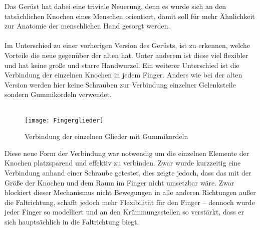 \documentclass[titlepage,12pt,twoside]{article}
\begin{document}
\hfill \break
Das Gerüst hat dabei eine triviale Neuerung, denn es wurde sich an den tatsächlichen Knochen eines Menschen orientiert, damit soll für mehr Ähnlichkeit zur Anatomie der menschlichen Hand gesorgt werden. \\
\\
Im Unterschied zu einer vorherigen Version des Gerüsts, ist zu erkennen, welche Vorteile die neue gegenüber der alten hat. Unter anderem ist diese viel flexibler und hat keine große und starre Handwurzel. 
Ein weiterer Unterschied ist die Verbindung der einzelnen Knochen in jedem Finger. Anders wie bei der alten Version werden hier keine Schrauben zur Verbindung einzelner Gelenksteile sondern Gummikordeln verwendet. \\
\\
\begin{figure}[H]
	\begin{center}
		\scalebox{0.5}
		{\texttt{[image: Fingerglieder]}}
		\caption{Verbindung der einzelnen Glieder mit Gummikordeln}
		\label{fig:Fingerglieder}			
	\end{center}
\end{figure}
\hfill \break
Diese neue Form der Verbindung war notwendig um die einzelnen Elemente der Knochen platzsparend und effektiv zu verbinden. Zwar wurde kurzzeitig eine Verbindung anhand einer Schraube getestet, dies zeigte jedoch, dass das mit der Größe der Knochen 
und dem Raum im Finger nicht umsetzbar wäre. Zwar blockiert dieser Mechanismus nicht Bewegungen in alle anderen Richtungen außer die Faltrichtung, schafft jedoch mehr Flexibilität für den Finger – dennoch wurde jeder Finger so modelliert und an den 
Krümmungsstellen so verstärkt, dass er sich hauptsächlich in die Faltrichtung biegt. \\
\\
\newpage
\end{document}
